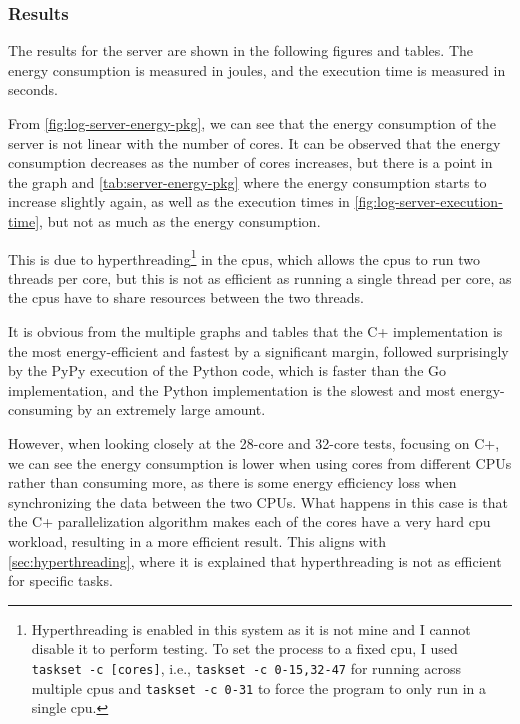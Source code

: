 \subsubsection{Results}

\newlength{\plotwidthgraph}
\newlength{\plotheightgraph}
\setlength{\plotwidthgraph}{14cm}
\setlength{\plotheightgraph}{8cm}

The results for the server are shown in the following figures and tables. The energy consumption is measured in joules, and the execution time is measured in seconds. 








From \autoref{fig:log-server-energy-pkg}, we can see that the energy consumption of the server is not linear with the number of cores. It can be observed that the energy consumption decreases as the number of cores increases, but there is a point in the graph and \autoref{tab:server-energy-pkg} where the energy consumption starts to increase slightly again, as well as the execution times in \autoref{fig:log-server-execution-time}, but not as much as the energy consumption.

This is due to hyperthreading\footnote{Hyperthreading is enabled in this system as it is not mine and I cannot disable it to perform testing. To set the process to a fixed \gls{cpu}, I used \texttt{taskset -c [cores]}, i.e., \texttt{taskset -c 0-15,32-47} for running across multiple \glspl{cpu} and \texttt{taskset -c 0-31} to force the program to only run in a single \gls{cpu}.} in the \glspl{cpu}, which allows the \glspl{cpu} to run two threads per core, but this is not as efficient as running a single thread per core, as the \glspl{cpu} have to share resources between the two threads.

It is obvious from the multiple graphs and tables that the C\++ implementation is the most energy-efficient and fastest by a significant margin, followed surprisingly by the PyPy execution of the Python code, which is faster than the Go implementation, and the Python implementation is the slowest and most energy-consuming by an extremely large amount.

However, when looking closely at the 28-core and 32-core tests, focusing on C\++, we can see the energy consumption is lower when using cores from different CPUs rather than consuming more, as there is some energy efficiency loss when synchronizing the data between the two CPUs. What happens in this case is that the C\++ parallelization algorithm makes each of the cores have a very hard \gls{cpu} workload, resulting in a more efficient result. This aligns with \autoref{sec:hyperthreading}, where it is explained that hyperthreading is not as efficient for specific tasks.

